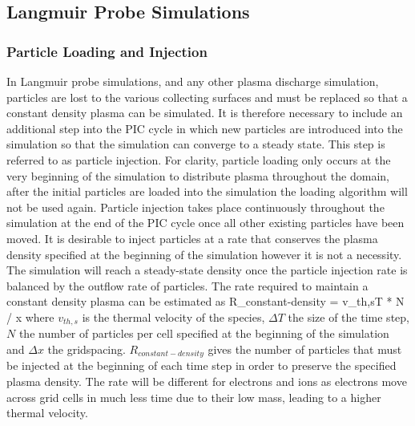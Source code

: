 \subsection{Langmuir Probe Simulations}
\subsubsection{Particle Loading and Injection}
In Langmuir probe simulations, and any other plasma discharge simulation, particles are lost to the various collecting surfaces and must be replaced so that a constant density plasma can be simulated. It is therefore necessary to include an additional step  into the PIC cycle in which new particles are introduced into the simulation so that the simulation can converge to a steady state. This step is referred to as particle injection. For clarity, particle loading only occurs at the very beginning of the simulation to distribute plasma throughout the domain, after the initial particles are loaded into the simulation the loading algorithm will not be used again. Particle injection takes place continuously throughout the simulation at the end of the PIC cycle once all other existing particles have been moved.
It is desirable to inject particles at a rate that conserves the plasma density specified at the beginning of the simulation however it is not a necessity. The simulation will reach a steady-state density once the particle injection rate is balanced by the outflow rate of particles. The rate required to maintain a constant density plasma can be estimated as 
\be
R_{constant-density} = v_{th,s}\Delta T * N / \Delta x
\label{eq:rate}
\ee
where $v_{th,s}$ is the thermal velocity of the species, $\Delta T$ the size of the time step, $N$ the number of particles per cell specified at the beginning of the simulation and $\Delta x$ the gridspacing. $R_{constant-density}$ gives the number of particles that must be injected at the beginning of each time step in order to preserve the specified plasma density. The rate will be different for electrons and ions as electrons move across grid cells in much less time due to their low mass, leading to a higher thermal velocity.

